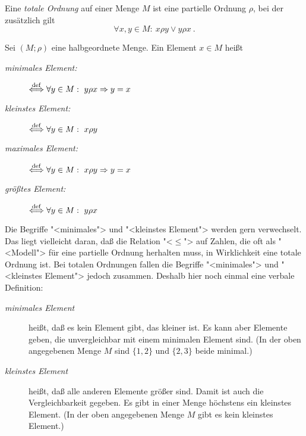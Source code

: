 \begin{definition}
  \label{def:total-order}
    Eine \emph{totale Ordnung} 
    auf einer Menge $M$ ist eine partielle Ordnung
    $\rho$, bei der zusätzlich gilt
    \[ \forall x,y \in M:\ x \rho y \vee y \rho x\ .\]
\end{definition}
\begin{definition}
    Sei $(M;\rho)$ eine halbgeordnete Menge. Ein Element $x \in M$ heißt
    \begin{description}
    \item[\it minimales Element:] $\stackrel{\rm def}{\Longleftrightarrow} \forall y \in M:\  y \rho x 
                                         \Rightarrow y=x$
    \item[\it kleinstes Element:] $\stackrel{\rm def}{\Longleftrightarrow} \forall y \in M:\  x \rho y$
    \item[\it maximales Element:] $\stackrel{\rm def}{\Longleftrightarrow} \forall y \in M:\  x \rho y 
                                         \Rightarrow y=x$
    \item[\it größtes Element:] $\stackrel{\rm def}{\Longleftrightarrow} \forall y \in M:\  y \rho x$
    \end{description}
\end{definition}

Die Begriffe "<minimales"> und 
"<kleinstes Element"> werden gern
verwechselt. Das liegt vielleicht daran, daß die Relation "<$\leq$"> auf
Zahlen, die oft als "<Modell"> für eine partielle Ordnung herhalten muss, in
Wirklichkeit eine totale Ordnung ist. Bei totalen Ordnungen fallen die Begriffe
"<minimales"> und "<kleinstes Element"> jedoch zusammen.
Deshalb hier noch einmal eine verbale Definition:
\begin{description}
\item[\it minimales Element] heißt, daß es kein Element gibt, das kleiner
             ist. Es kann aber Elemente geben, die unvergleichbar mit einem
             minimalen Element sind. (In der oben angegebenen Menge $M$ sind
             $\{1,2\}$ und $\{2,3\}$ beide minimal.)
\item[\it kleinstes Element] heißt, daß alle anderen Elemente größer
             sind. Damit ist auch die Vergleichbarkeit gegeben. Es gibt in einer
             Menge höchstens ein kleinstes Element. (In der oben
             angegebenen Menge $M$ gibt es kein kleinstes Element.)
\end{description}

